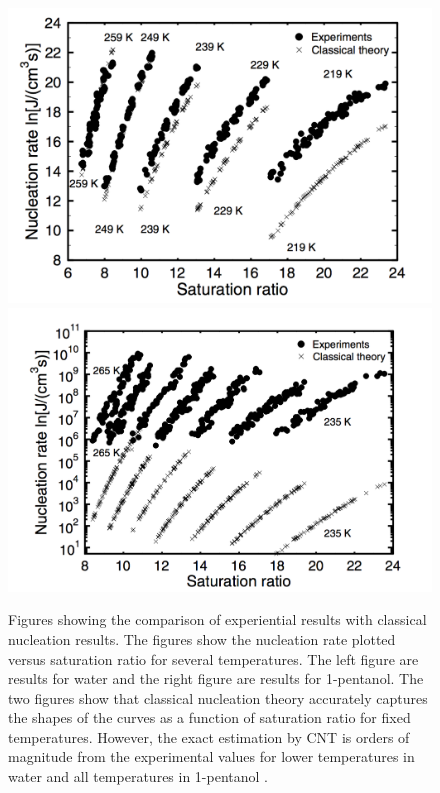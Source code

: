 \begin{figure}[h]
	\centering
	\includegraphics[width = .45\textwidth]{./Figures/CNT/cnt_failure.png}
	\includegraphics[width = .49\textwidth]{./Figures/CNT/cnt_failure_2.png}
	\caption[Figures showing the comparison of experiential results with classical nucleation results.  The figures show the nucleation rate plotted versus saturation ratio for several temperatures.  The left figure are results for water and the right figure are results for 1-pentanol.  The two figures show that classical nucleation theory accurately captures the shapes of the curves as a function of saturation ratio for fixed temperatures.  However, the exact estimation by CNT is orders of magnitude from the experimental values for lower temperatures in water and all temperatures in 1-pentanol.]{Figures showing the comparison of experiential results with classical nucleation results.  The figures show the nucleation rate plotted versus saturation ratio for several temperatures.  The left figure are results for water and the right figure are results for 1-pentanol.  The two figures show that classical nucleation theory accurately captures the shapes of the curves as a function of saturation ratio for fixed temperatures.  However, the exact estimation by CNT is orders of magnitude from the experimental values for lower temperatures in water and all temperatures in 1-pentanol \cite{Vehkamaki2006}.}
	\label{cnt_failure}
\end{figure}

